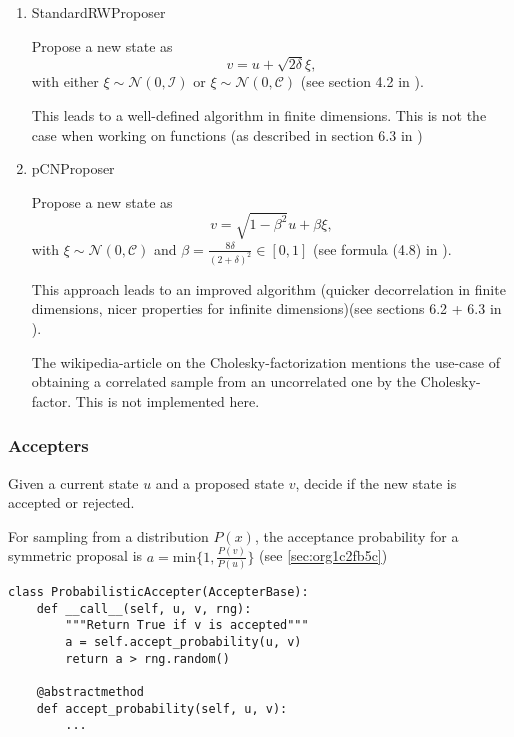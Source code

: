 \documentclass[11pt]{article}
\newcommand{\C}{{\mathcal{C}}}
\newcommand{\I}{{\mathcal{I}}}
\newcommand{\N}[2]{\mathcal{N}\left(#1,#2\right)}
\begin{document}
\begin{enumerate}
\item StandardRWProposer
\label{sec:org623ce20}

Propose a new state as
$$v = u + \sqrt{2\delta} \xi,$$
with either \(\xi \sim \N{0}{\I}\) or \(\xi \sim \N{0}{\C}\) (see section 4.2 in \cite{cotter_mcmc_2013}).

This leads to a well-defined algorithm in finite dimensions.
This is not the case when working on functions (as described in section 6.3 in \cite{cotter_mcmc_2013})

\item pCNProposer
\label{sec:org7442233}

Propose a new state as
$$v = \sqrt{1-\beta^2} u + \beta \xi,$$
with \(\xi \sim \N{0}{\C}\) and \(\beta = \frac{8\delta}{(2+\delta)^2} \in [0,1]\)
(see formula (4.8) in \cite{cotter_mcmc_2013}).

This approach leads to an improved algorithm (quicker decorrelation in finite dimensions,
nicer properties for infinite dimensions)(see sections 6.2 + 6.3 in \cite{cotter_mcmc_2013}).

The wikipedia-article on the Cholesky-factorization mentions the use-case of obtaining a
correlated sample from an uncorrelated one by the Cholesky-factor. This is not implemented here.
\end{enumerate}
\subsubsection{Accepters}
\label{sec:org840936f}

Given a current state \(u\) and a proposed state \(v\), decide if the new state is accepted or rejected.

For sampling from a distribution \(P(x)\), the acceptance probability for a symmetric proposal is
\(a = \text{min}\{1, \frac{P(v)}{P(u)}\}\)
(see \ref{sec:org1c2fb5c})

\begin{verbatim}
class ProbabilisticAccepter(AccepterBase):
    def __call__(self, u, v, rng):
        """Return True if v is accepted"""
        a = self.accept_probability(u, v)
        return a > rng.random()

    @abstractmethod
    def accept_probability(self, u, v):
        ...
\end{verbatim}
\end{document}
